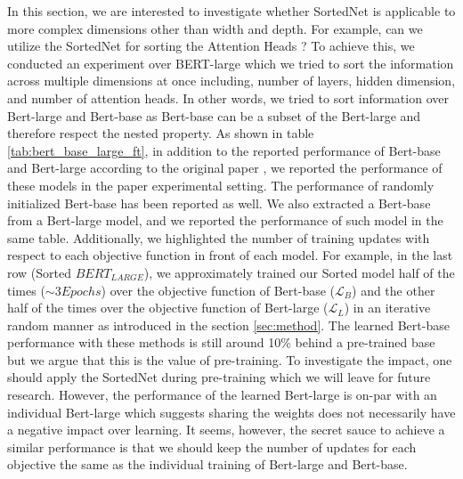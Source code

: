 \documentclass[letterpaper]{article} %
\begin{document}
In this section, we are interested to investigate whether SortedNet is applicable to more complex dimensions other than width and depth. For example, can we utilize the SortedNet for sorting the Attention Heads \cite{vaswani2017attention}? To achieve this, we conducted an experiment over BERT-large \cite{devlin2019bert} which we tried to sort the information across multiple dimensions at once including, number of layers, hidden dimension, and number of attention heads. In other words, we tried to sort information over Bert-large and Bert-base as Bert-base can be a subset of the Bert-large and therefore respect the nested property. As shown in table \ref{tab:bert_base_large_ft}, in addition to the reported performance of Bert-base and Bert-large according to the original paper \cite{devlin2019bert}, we reported the performance of these models in the paper experimental setting. The performance of randomly initialized Bert-base has been reported as well. We also extracted a Bert-base from a Bert-large model, and we reported the performance of such model in the same table. Additionally, we highlighted the number of training updates with respect to each objective function in front of each model. For example, in the last row (Sorted $BERT_{LARGE}$), we approximately trained our Sorted model half of the times ($\sim3 Epochs$) over the objective function of Bert-base ($\mathcal{L}_B$) and the other half of the times over the objective function of Bert-large ($\mathcal{L}_L$) in an iterative random manner as introduced in the section \ref{sec:method}. The learned Bert-base performance with these methods is still around 10\% behind a pre-trained base but we argue that this is the value of pre-training. To investigate the impact, one should apply the SortedNet during pre-training which we will leave for future research. However, the performance of the learned Bert-large is on-par with an individual Bert-large which suggests sharing the weights does not necessarily have a negative impact over learning. It seems, however, the secret sauce to achieve a similar performance is that we should keep the number of updates for each objective the same as the individual training of Bert-large and Bert-base.


\end{document}
